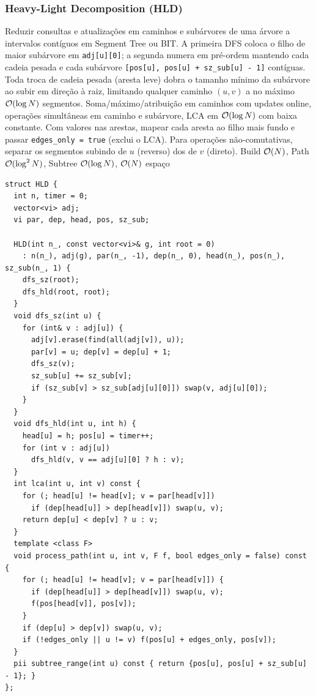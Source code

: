 \subsubsection{Heavy-Light Decomposition (HLD)}
\algobox
  {Reduzir consultas e atualizações em caminhos e subárvores de uma árvore a intervalos contíguos em Segment Tree ou BIT.}
  {A primeira DFS coloca o filho de maior subárvore em \texttt{adj[u][0]}; a segunda numera em pré-ordem mantendo cada cadeia pesada e cada subárvore \texttt{[pos[u], pos[u] + sz\_sub[u] - 1]} contíguas.}
  {Toda troca de cadeia pesada (aresta leve) dobra o tamanho mínimo da subárvore ao subir em direção à raiz, limitando qualquer caminho $(u, v)$ a no máximo $\mathcal{O}(\log N)$ segmentos.}
  {Soma/máximo/atribuição em caminhos com updates online, operações simultâneas em caminho e subárvore, LCA em $\mathcal{O}(\log N)$ com baixa constante.}
  {Com valores nas arestas, mapear cada aresta ao filho mais fundo e passar \texttt{edges\_only = true} (exclui o LCA). Para operações não-comutativas, separar os segmentos subindo de $u$ (reverso) dos de $v$ (direto).}
  {Build $\mathcal{O}(N)$, Path $\mathcal{O}(\log^2 N)$, Subtree $\mathcal{O}(\log N)$, $\mathcal{O}(N)$ espaço}

\begin{lstlisting}
struct HLD {
  int n, timer = 0;
  vector<vi> adj;
  vi par, dep, head, pos, sz_sub;

  HLD(int n_, const vector<vi>& g, int root = 0)
    : n(n_), adj(g), par(n_, -1), dep(n_, 0), head(n_), pos(n_), sz_sub(n_, 1) {
    dfs_sz(root);
    dfs_hld(root, root);
  }
  void dfs_sz(int u) {
    for (int& v : adj[u]) {
      adj[v].erase(find(all(adj[v]), u));
      par[v] = u; dep[v] = dep[u] + 1;
      dfs_sz(v);
      sz_sub[u] += sz_sub[v];
      if (sz_sub[v] > sz_sub[adj[u][0]]) swap(v, adj[u][0]);
    }
  }
  void dfs_hld(int u, int h) {
    head[u] = h; pos[u] = timer++;
    for (int v : adj[u])
      dfs_hld(v, v == adj[u][0] ? h : v);
  }
  int lca(int u, int v) const {
    for (; head[u] != head[v]; v = par[head[v]])
      if (dep[head[u]] > dep[head[v]]) swap(u, v);
    return dep[u] < dep[v] ? u : v;
  }
  template <class F>
  void process_path(int u, int v, F f, bool edges_only = false) const {
    for (; head[u] != head[v]; v = par[head[v]]) {
      if (dep[head[u]] > dep[head[v]]) swap(u, v);
      f(pos[head[v]], pos[v]);
    }
    if (dep[u] > dep[v]) swap(u, v);
    if (!edges_only || u != v) f(pos[u] + edges_only, pos[v]);
  }
  pii subtree_range(int u) const { return {pos[u], pos[u] + sz_sub[u] - 1}; }
};
\end{lstlisting}

